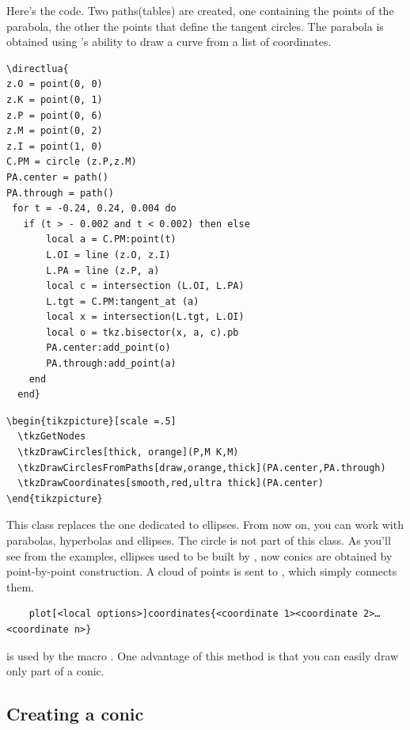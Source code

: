 Here's the code. Two paths(tables) are created, one containing the points of the parabola, the other the points that define the tangent circles.
The parabola is obtained using \TIKZ{}'s ability to draw a curve from a list of coordinates.

\begin{verbatim}
\directlua{
z.O = point(0, 0)
z.K = point(0, 1)
z.P = point(0, 6)
z.M = point(0, 2)
z.I = point(1, 0)
C.PM = circle (z.P,z.M)
PA.center = path()
PA.through = path()
 for t = -0.24, 0.24, 0.004 do
   if (t > - 0.002 and t < 0.002) then else
       local a = C.PM:point(t)
       L.OI = line (z.O, z.I)
       L.PA = line (z.P, a)
       local c = intersection (L.OI, L.PA)
       L.tgt = C.PM:tangent_at (a)
       local x = intersection(L.tgt, L.OI)
       local o = tkz.bisector(x, a, c).pb
       PA.center:add_point(o)
       PA.through:add_point(a)
    end
  end}
\end{verbatim}

\begin{verbatim}
\begin{tikzpicture}[scale =.5]
  \tkzGetNodes
  \tkzDrawCircles[thick, orange](P,M K,M)
  \tkzDrawCirclesFromPaths[draw,orange,thick](PA.center,PA.through)
  \tkzDrawCoordinates[smooth,red,ultra thick](PA.center)
\end{tikzpicture}
\end{verbatim}
This class replaces the one dedicated to ellipses. From now on, you can work with parabolas, hyperbolas and ellipses. The circle is not part of this class.
As you'll see from the examples, ellipses used to be built by \TIKZ{}, now conics are obtained by point-by-point construction. A cloud of points is sent to \TIKZ{}, which simply connects them.

\begin{mybox}
  \begin{verbatim}
    plot[<local options>]coordinates{<coordinate 1><coordinate 2>…<coordinate n>}
  \end{verbatim}
\end{mybox}

is used by the macro . One advantage of this method is that you can easily draw only part of a conic.


\subsection{Creating a conic}
\label{sub:creating_a_conic}

